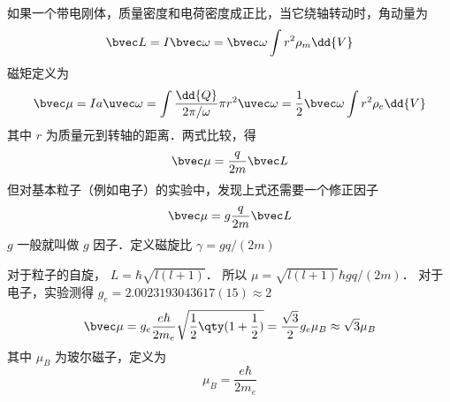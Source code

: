
如果一个带电刚体，质量密度和电荷密度成正比，当它绕轴转动时，角动量为
\begin{equation}
\bvec L = I\bvec \omega  = \bvec \omega \int r^2 \rho_m \dd{V}
\end{equation}
磁矩定义为
\begin{equation}
\bvec \mu  = Ia \uvec\omega = \int \frac{\dd{Q}}{2\pi/\omega}  \pi r^2 \uvec \omega
= \frac12 \bvec \omega \int r^2\rho_e \dd{V} 
\end{equation}
其中 $r$ 为质量元到转轴的距离．两式比较，得
\begin{equation}
\bvec \mu  = \frac{q}{2m} \bvec L
\end{equation}
但对基本粒子（例如电子）的实验中，发现上式还需要一个修正因子
\begin{equation}
\bvec \mu  = g\frac{q}{2m}\bvec L
\end{equation}
$g$ 一般就叫做 $g$ 因子．定义磁旋比 $\gamma  = gq/(2m)$

对于粒子的自旋， $L = \hbar \sqrt{l(l + 1)} $． 所以 $\mu = \sqrt{l (l + 1)} \hbar gq/(2m)$． 
对于电子，实验测得 $g_e = 2.0023193043617(15) \approx 2$ 
\begin{equation}
\bvec \mu  = g_e \frac{e\hbar}{2 m_e} \sqrt{\frac12 \qty(1 + \frac12)}  = \frac{\sqrt 3}{2} g_e \mu_B \approx \sqrt 3 \mu_B
\end{equation}
其中 $\mu_B$ 为玻尔磁子，定义为
\begin{equation}
\mu_B = \frac{e\hbar}{2 m_e}
\end{equation}

